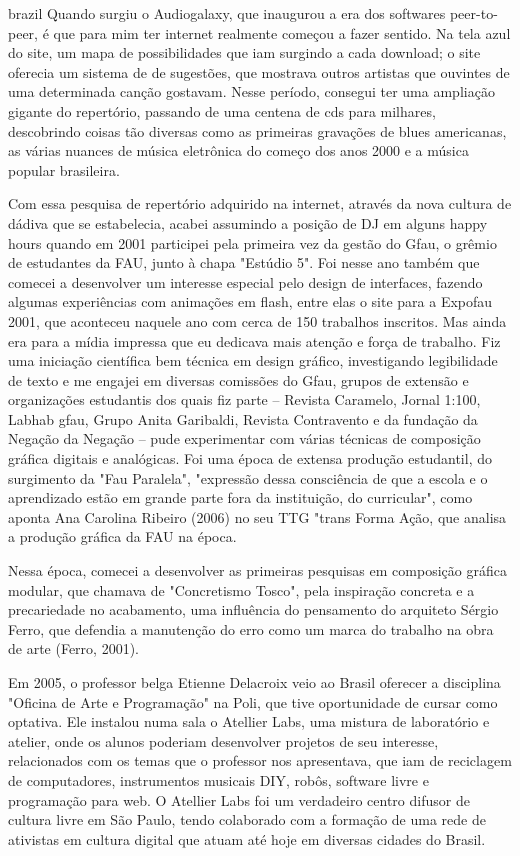 \begin{otherlanguage*}{brazil}
Quando surgiu o Audiogalaxy, que inaugurou a era dos softwares peer-to-peer, é que para mim ter internet realmente começou a fazer sentido. Na tela azul do site, um mapa de possibilidades que iam surgindo a cada download; o site oferecia um sistema de de sugestões, que mostrava outros artistas que ouvintes de uma determinada canção gostavam. Nesse período, consegui ter uma ampliação gigante do repertório, passando de uma centena de cds para milhares, descobrindo coisas tão diversas como as primeiras gravações de blues americanas, as várias nuances de música eletrônica do começo dos anos 2000 e a música popular brasileira. 



Com essa pesquisa de repertório adquirido na internet, através da nova cultura de dádiva que se estabelecia, acabei assumindo a posição de DJ em alguns happy hours quando em 2001 participei pela primeira vez da gestão do Gfau, o grêmio de estudantes da FAU, junto à chapa "Estúdio 5". Foi nesse ano também que comecei a desenvolver um interesse especial pelo design de interfaces, fazendo algumas experiências com animações em flash, entre elas o site para a Expofau 2001, que aconteceu naquele ano com cerca de 150 trabalhos inscritos. Mas ainda era para a mídia impressa que eu dedicava mais atenção e força de trabalho. Fiz uma iniciação científica bem técnica em design gráfico, investigando legibilidade de texto e me engajei em diversas comissões do Gfau, grupos de extensão e organizações estudantis dos quais fiz parte – Revista Caramelo, Jornal 1:100, Labhab gfau, Grupo Anita Garibaldi, Revista Contravento e da fundação da Negação da Negação – pude experimentar com várias técnicas de composição gráfica digitais e analógicas. Foi uma época de extensa produção estudantil, do surgimento da "Fau Paralela", "expressão dessa consciência de que a escola e o aprendizado estão em grande parte fora da instituição, do curricular", como aponta Ana Carolina Ribeiro (2006) no seu TTG "trans Forma Ação, que analisa a produção gráfica da FAU na época. 

Nessa época, comecei a desenvolver as primeiras pesquisas em composição gráfica modular, que chamava de "Concretismo Tosco", pela inspiração concreta e a precariedade no acabamento, uma influência do pensamento do arquiteto Sérgio Ferro, que defendia a manutenção do erro como um marca do trabalho na obra de arte (Ferro, 2001). 

Em 2005, o professor belga Etienne Delacroix veio ao Brasil oferecer a disciplina "Oficina de Arte e Programação" na Poli, que tive oportunidade de cursar como optativa. Ele instalou numa sala o Atellier Labs, uma mistura de laboratório e atelier, onde os alunos poderiam desenvolver projetos de seu interesse, relacionados com os temas que o professor nos apresentava, que iam de reciclagem de computadores, instrumentos musicais DIY, robôs, software livre e programação para web. O Atellier Labs foi um verdadeiro centro difusor de cultura livre em São Paulo, tendo colaborado com a formação de uma rede de ativistas em cultura digital que atuam até hoje em diversas cidades do Brasil. 


\end{otherlanguage*}
